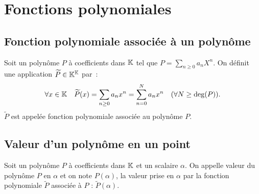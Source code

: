 \section{Fonctions polynomiales}

\subsection{Fonction polynomiale associée à un polynôme}

\begin{defdef}
  Soit un polynôme $P$ à coefficients dans $\mathbb{K}$ tel que $P=\sum_{n \geq 0}a_n X^n$. On définit une application $\widetilde{P} \in \mathbb{K}^{\mathbb{K}}$ par~:
  \begin{equation}
    \forall x \in \mathbb{K} \quad \widetilde{P}(x) = \sum_{n \geq 0} a_n x^n=\sum_{n=0}^N a_n x^n \quad (\forall N \geq \deg(P)).
  \end{equation}
  $\widetilde{P}$ est appelée fonction polynomiale associée au polynôme $P$.
\end{defdef}

\subsection{Valeur d'un polynôme en un point}

\begin{defdef}
  Soit un polynôme $P$ à coefficients dans $\mathbb{K}$ et un scalaire $\alpha$. On appelle valeur du polynôme $P$ en $\alpha$ et on note $P(\alpha)$, la valeur prise en $\alpha$ par la fonction polynomiale $\widetilde{P}$ associée à $P$ : $\widetilde{P}(\alpha)$.
\end{defdef}

